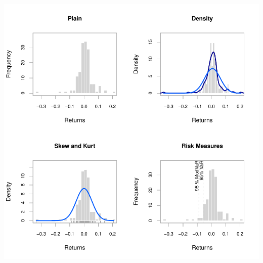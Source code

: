 \documentclass[12pt,letterpaper,english]{article}
\begin{document}
\includegraphics{UnSmoothReturnAnalysis-007}
\end{document}
